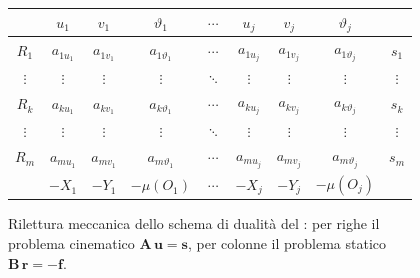 \begin{figure}[htbp]
	\centering
	\renewcommand{\arraystretch}{1.3}
	\small
	\begin{tabular}{c|ccc|c|ccc|c}
		& $u_1$ & $v_1$ & $\vartheta_1$
		& $\cdots$ & $u_j$ & $v_j$ & $\vartheta_j$ & \\
		\hline
		$R_1$ & $a_{1u_1}$ & $a_{1v_1}$ & $a_{1\vartheta_1}$
		& $\cdots$ & $a_{1u_j}$ & $a_{1v_j}$ & $a_{1\vartheta_j}$ & $s_1$ \\
		$\vdots$ & $\vdots$ & $\vdots$ & $\vdots$
		& $\ddots$ & $\vdots$ & $\vdots$ & $\vdots$ & $\vdots$ \\
		$R_k$ & $a_{ku_1}$ & $a_{kv_1}$ & $a_{k\vartheta_1}$
		& $\cdots$ & $a_{ku_j}$ & $a_{kv_j}$ & $a_{k\vartheta_j}$ & $s_k$ \\
		$\vdots$ & $\vdots$ & $\vdots$ & $\vdots$
		& $\ddots$ & $\vdots$ & $\vdots$ & $\vdots$ & $\vdots$ \\
		$R_m$ & $a_{mu_1}$ & $a_{mv_1}$ & $a_{m\vartheta_1}$
		& $\cdots$ & $a_{mu_j}$ & $a_{mv_j}$ & $a_{m\vartheta_j}$ & $s_m$ \\
		\hline
		& $-X_1$ & $-Y_1$ & $-\mu(O_1)$
		& $\cdots$ & $-X_j$ & $-Y_j$ & $-\mu(O_j)$ &
	\end{tabular}
	\caption{Rilettura meccanica dello schema di dualità
		del : per righe il problema cinematico
		$\bm{A}\,\bm{u}=\bm{s}$, per colonne il problema
		statico $\bm{B}\,\bm{r}=-\bm{f}$.}
	\label{fig:duale_mec}
\end{figure}
